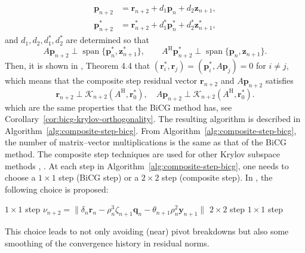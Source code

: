\[\begin{aligned}\bm p_{n+2}&=\bm r_{n+2}+d_1\bm p_n+d_2\bm z_{n+1},\\\bm p_{n+2}^{*}&=\bm r_{n+2}^{*}+d_1^{*}\bm p_n^{*}+d_2^{*}\bm z_{n+1}^{*},\end{aligned}\]
{and $d_1,d_2,d_1^{*},d_2^{*}$ are determined so that}
\[A\bm p_{n+2}\perp\operatorname{span}\{\bm p_n^{*},\bm z_{n+1}^{*}\},\qquad A^{\mathrm H}\bm p_{n+2}^{*}\perp\operatorname{span}\{\bm p_n,\bm z_{n+1}\}.\]
{Then, it is shown in , Theorem 4.4 that $(\bm r_i^{*},\bm r_j)=(\bm p_i^{*},A\bm p_j)=0$ for $i\ne j$, which means that the composite step residual vector $\bm r_{n+2}$ and $A\bm p_{n+2}$ satisfies}
\[\bm r_{n+2}\perp\mathcal K_{n+2}(A^{\mathrm H},\bm r_0^{*}),\quad A\bm p_{n+2}\perp\mathcal K_{n+2}(A^{\mathrm H},\bm r_0^{*}).\]
{which are the same properties that the BiCG method has, see Corollary\ \ref{cor:bicg-krylov-orthogonality}. The resulting algorithm is described in Algorithm\ \ref{alg:composite-step-bicg}.}
{From Algorithm\ \ref{alg:composite-step-bicg}, the number of matrix--vector multiplications is the same as that of the BiCG method. The composite step techniques are used for other Krylov subspace methods , .}
{At each step in Algorithm\ \ref{alg:composite-step-bicg}, one needs to choose a $1\times1$ step (BiCG step) or a $2\times2$ step (composite step). In , the following choice is proposed:}
\begin{algorithmic}[1]
\State $1\times1$ {step}
\Else
\State $\nu_{n+2}=\|\delta_n\bm r_n-\rho_n^3\zeta_{n+1}\bm q_n-\theta_{n+1}\rho_n^2\bm y_{n+1}\|$
\State $2\times2$ {step}
\Else\State $1\times1$ {step}\EndIf\EndIf
\end{algorithmic}
{This choice leads to not only avoiding (near) pivot breakdowns but also some smoothing of the convergence history in residual norms.}
